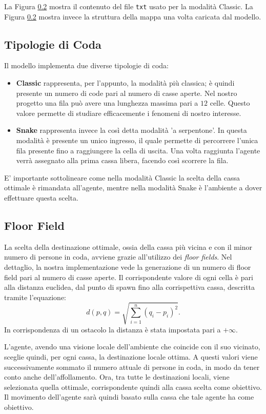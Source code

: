 La Figura \ref{} mostra il contenuto del file \lstinline{txt} usato per la modalità Classic. La Figura \ref{} mostra invece la struttura della mappa una volta caricata dal modello.

\subsection{Tipologie di Coda}
Il modello implementa due diverse tipologie di coda:
\begin{itemize}
    \item \textbf{Classic} rappresenta, per l'appunto, la modalità più classica; è quindi presente un numero di code pari al numero di casse aperte. 
    Nel nostro progetto una fila può avere una lunghezza massima pari a $12$ celle. 
    Questo valore permette di studiare efficacemente i fenomeni di nostro interesse. 
    \item \textbf{Snake} rappresenta invece la così detta modalità 'a serpentone'. 
    In questa modalità è presente un unico ingresso, il quale permette di percorrere l'unica fila presente fino a raggiungere la cella di uscita. Una volta raggiunta l'agente verrà assegnato alla prima cassa libera, facendo così scorrere la fila.
\end{itemize}
E' importante sottolineare come nella modalità Classic la scelta della cassa ottimale è rimandata all'agente, mentre nella modalità Snake è l'ambiente a dover effettuare questa scelta.

\subsection{Floor Field}
La scelta della destinazione ottimale, ossia della cassa più vicina e con il minor numero di persone in coda, avviene grazie all'utilizzo dei \textit{floor fields}.
Nel dettaglio, la nostra implementazione vede la generazione di un numero di floor field pari al numero di casse aperte. 
Il corrispondente valore di ogni cella è pari alla distanza euclidea, dal punto di spawn fino alla corrispettiva cassa, descritta tramite l'equazione:
\begin{equation*}
 d\left( p,q\right)   = \sqrt {\sum _{i=1}^{n}  \left( q_{i}-p_{i}\right)^2 } .
\end{equation*}
In corrispondenza di un ostacolo la distanza è stata impostata pari a $+ \infty$.

L'agente, avendo una visione locale dell'ambiente che coincide con il suo vicinato, sceglie quindi, per ogni cassa, la destinazione locale ottima. 
A questi valori viene successivamente sommato il numero attuale di persone in coda, in modo da tener conto anche dell'affollamento.
Ora, tra tutte le destinazioni locali, viene selezionata quella ottimale, corrispondente quindi alla cassa scelta come obiettivo.
Il movimento dell'agente sarà quindi basato sulla cassa che tale agente ha come obiettivo.

